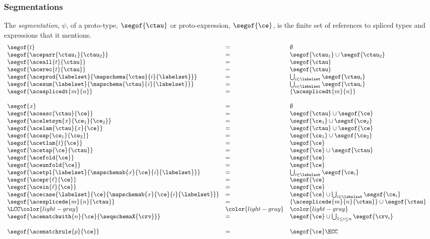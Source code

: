 \subsubsection{Segmentations}\label{appendix:segmentations-U}
The \emph{segmentation}, $\psi$, of a proto-type, $\segof{\ctau}$ or proto-expression, $\segof{\ce}$, is the finite set of references to spliced types and expressions that it mentions.
\[
\begin{array}{lll}
\segof{t} & = & \emptyset\\
\segof{\aceparr{\ctau_1}{\ctau_2}} & = & \segof{\ctau_1} \cup \segof{\ctau_2}\\
\segof{\aceall{t}{\ctau}} & = & \segof{\ctau}\\
\segof{\acerec{t}{\ctau}} & = & \segof{\ctau}\\
\segof{\aceprod{\labelset}{\mapschema{\ctau}{i}{\labelset}}} & = & \bigcup_{i \in \labelset} \segof{\ctau_i}\\
\segof{\acesum{\labelset}{\mapschema{\ctau}{i}{\labelset}}} & = & \bigcup_{i \in \labelset} \segof{\ctau_i}\\
\segof{\acesplicedt{m}{n}} & = & \{ \acesplicedt{m}{n} \}\\
~\\
\segof{x} & = & \emptyset\\
\segof{\aceasc{\ctau}{\ce}} & = & \segof{\ctau} \cup \segof{\ce}\\
\segof{\aceletsyn{x}{\ce_1}{\ce_2}} & = & \segof{\ce_1} \cup \segof{\ce_2}\\
\segof{\acelam{\ctau}{x}{\ce}} & = & \segof{\ctau} \cup \segof{\ce}\\
\segof{\aceap{\ce_1}{\ce_2}} & = & \segof{\ce_1} \cup \segof{\ce_2}\\
\segof{\acetlam{t}{\ce}} & = & \segof{\ce}\\
\segof{\acetap{\ce}{\ctau}} & = & \segof{\ce} \cup \segof{\ctau}\\
\segof{\acefold{\ce}} & = & \segof{\ce}\\
\segof{\aceunfold{\ce}} & = & \segof{\ce}\\
\segof{\acetpl{\labelset}{\mapschemab{x}{\ce}{i}{\labelset}}} & = & \bigcup_{i \in \labelset} \segof{\ce_i}\\
\segof{\acepr{\ell}{\ce}} & = & \segof{\ce}\\
\segof{\acein{\ell}{\ce}} & = & \segof{\ce}\\
\segof{\acecase{\labelset}{\ce}{\mapschemab{x}{\ce}{i}{\labelset}}} & = & \segof{\ce} \cup \bigcup_{i \in \labelset} \segof{\ce_i}\\
\segof{\acesplicede{m}{n}{\ctau}} & = & \{ \acesplicede{m}{n}{\ctau} \} \cup \segof{\ctau}\\
\LCC \color{light-gray} & \color{light-gray} & \color{light-gray}\\
\segof{\acematchwith{n}{\ce}{\seqschemaX{\crv}}} & = & \segof{\ce} \cup \bigcup_{1 \leq i \leq n} \segof{\crv_i}\\
~\\
\segof{\acematchrule{p}{\ce}} & = & \segof{\ce}\ECC
\end{array}
\]


